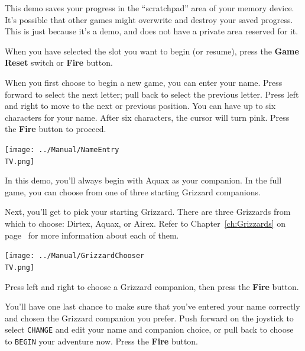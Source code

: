 \documentclass[10pt,twocolumn,openany,article]{memoir}
\newcommand\TV{NTSC}
\newcommand\TV{PAL}
\newcommand\TV{SECAM}
\begin{document}
\ifdefined\DEMO

\skip

This demo saves your progress in  the ``scratchpad'' area of your memory
device. It's possible that other  games might overwrite and destroy your
saved progress.  This is  just because  it's a demo,  and does  not have
a private area reserved for it.

\skip

\fi

When you have selected the slot you want to begin (or resume), press the
\textbf{Game Reset} switch or \textbf{Fire} button.

\fi

\ifdefined\NOSAVE\else

When you  first choose  to begin a  new game, you  can enter  your name.
Press  forward to  select  the  next letter;  pull  back  to select  the
previous letter.  Press left and right  to move to the  next or previous
position. You  can have up  to six characters  for your name.  After six
characters, the  cursor will turn  pink. Press the  \textbf{Fire} button
to proceed.

\begin{center}
  \texttt{[image: ../Manual/NameEntry\\TV.png]}
\end{center}

\ifdefined\DEMO

In this demo,  you'll always begin with Aquax as  your companion. In the
full game, you can choose from one of three starting Grizzard companions.

\else

Next,  you'll  get to  pick  your  starting  Grizzard. There  are  three
Grizzards  from which  to  choose:  Dirtex, Aquax,  or  Airex. Refer  to
Chapter~\ref{ch:Grizzards}   on  page~\pageref{ch:Grizzards}   for  more
information about each of them.

\begin{center}
  \texttt{[image: ../Manual/GrizzardChooser\\TV.png]}
\end{center}

Press left  and right  to choose  a Grizzard  companion, then  press the
\textbf{Fire} button.

You'll have one  last chance to make sure that  you've entered your name
correctly and chosen the Grizzard  companion you prefer. Push forward on
the joystick to select \texttt{CHANGE}  and edit your name and companion
choice, or  pull back  to choose to  \texttt{BEGIN} your  adventure now.
Press the \textbf{Fire} button.
\end{document}
